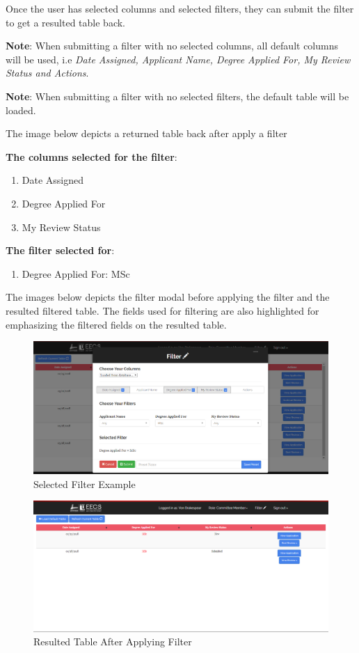 \documentclass[fontsize=12pt,paper=letter,twoside]{scrartcl}
\begin{document}
Once the user has selected columns and selected filters, they can submit the filter to get a resulted table back.

\bigskip
\noindent \textbf{Note}: When submitting a filter with no selected columns, all default columns will be used, i.e \emph{Date Assigned, Applicant Name, Degree Applied For, My Review Status and Actions}.

\bigskip
\noindent \textbf{Note}: When submitting a filter with no selected filters, the default table will be loaded.

\bigskip
\noindent The image below depicts a returned table back after apply a filter

\bigskip
\noindent \textbf{The columns selected for the filter}:
\begin{enumerate}
\item Date Assigned
\item Degree Applied For
\item My Review Status
\end{enumerate}

\noindent \textbf{The filter selected for}:
\begin{enumerate}
\item Degree Applied For: MSc
\end{enumerate}

\bigskip
\noindent The images below depicts the filter modal before applying the filter and the resulted filtered table. The fields used for filtering are also highlighted for emphasizing the filtered fields on the resulted table.

\begin{figure}[!htb]
\begin{center}
\includegraphics[width=.9\textwidth]{images/example_filter.png}
\end{center}
\caption{Selected Filter Example}
\label{fig:example_filter}
\end{figure}

\begin{figure}[!htb]
\begin{center}
\includegraphics[width=.9\textwidth]{images/example_filter_table.png}
\end{center}
\caption{Resulted Table After Applying Filter}
\label{fig:resulted_table}
\end{figure}
\end{document}
